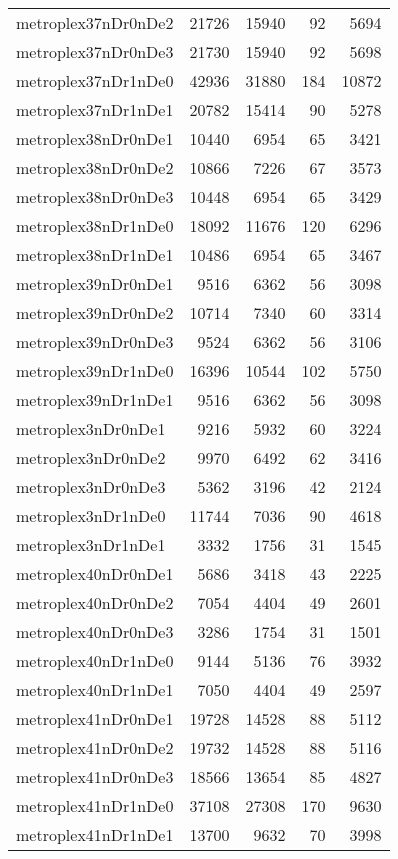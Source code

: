 \begin{tabular}{lrrrr}
metroplex37nDr0nDe2 & 21726 & 15940 & 92 & 5694 \\
metroplex37nDr0nDe3 & 21730 & 15940 & 92 & 5698 \\
metroplex37nDr1nDe0 & 42936 & 31880 & 184 & 10872 \\
metroplex37nDr1nDe1 & 20782 & 15414 & 90 & 5278 \\
metroplex38nDr0nDe1 & 10440 & 6954 & 65 & 3421 \\
metroplex38nDr0nDe2 & 10866 & 7226 & 67 & 3573 \\
metroplex38nDr0nDe3 & 10448 & 6954 & 65 & 3429 \\
metroplex38nDr1nDe0 & 18092 & 11676 & 120 & 6296 \\
metroplex38nDr1nDe1 & 10486 & 6954 & 65 & 3467 \\
metroplex39nDr0nDe1 & 9516 & 6362 & 56 & 3098 \\
metroplex39nDr0nDe2 & 10714 & 7340 & 60 & 3314 \\
metroplex39nDr0nDe3 & 9524 & 6362 & 56 & 3106 \\
metroplex39nDr1nDe0 & 16396 & 10544 & 102 & 5750 \\
metroplex39nDr1nDe1 & 9516 & 6362 & 56 & 3098 \\
metroplex3nDr0nDe1 & 9216 & 5932 & 60 & 3224 \\
metroplex3nDr0nDe2 & 9970 & 6492 & 62 & 3416 \\
metroplex3nDr0nDe3 & 5362 & 3196 & 42 & 2124 \\
metroplex3nDr1nDe0 & 11744 & 7036 & 90 & 4618 \\
metroplex3nDr1nDe1 & 3332 & 1756 & 31 & 1545 \\
metroplex40nDr0nDe1 & 5686 & 3418 & 43 & 2225 \\
metroplex40nDr0nDe2 & 7054 & 4404 & 49 & 2601 \\
metroplex40nDr0nDe3 & 3286 & 1754 & 31 & 1501 \\
metroplex40nDr1nDe0 & 9144 & 5136 & 76 & 3932 \\
metroplex40nDr1nDe1 & 7050 & 4404 & 49 & 2597 \\
metroplex41nDr0nDe1 & 19728 & 14528 & 88 & 5112 \\
metroplex41nDr0nDe2 & 19732 & 14528 & 88 & 5116 \\
metroplex41nDr0nDe3 & 18566 & 13654 & 85 & 4827 \\
metroplex41nDr1nDe0 & 37108 & 27308 & 170 & 9630 \\
metroplex41nDr1nDe1 & 13700 & 9632 & 70 & 3998 \\

\end{tabular}
